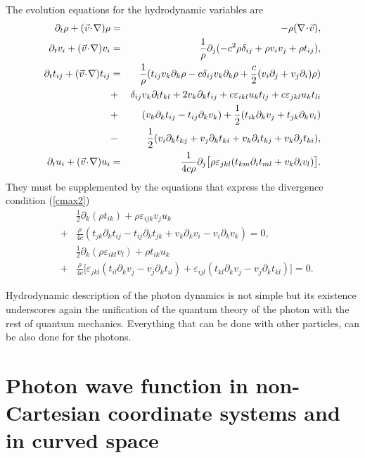 \documentclass[11pt]{article}
\begin{document}
The evolution equations for the hydrodynamic variables are
\begin{eqnarray}
  \partial_t\rho + (\vec v\!\cdot\!{\bf\nabla})\rho &=&
  -\rho({\bf\nabla}\!\cdot\!\vec v),\\
  \partial_t v_i + (\vec v\!\cdot\!{\bf\nabla}) v_i &=&
  \frac{1}{\rho}\partial_{j}(-c^2\rho\delta_{ij} +
  \rho v_i v_j +\rho t_{ij}),\\
  \partial_t t_{ij} + (\vec v\!\cdot\!{\bf\nabla}) t_{ij} &=&
  \frac{1}{\rho}(t_{ij}v_k\partial_{k}\rho-
  c\delta_{ij}v_k\partial_{k}\rho+
  \frac{c}{2}(v_i\partial_{j}+v_j\partial_{i})\rho)\nonumber\\
  &+&\delta_{ij}v_k\partial_{l} t_{kl}+2v_k\partial_{k} t_{ij}+
  c\varepsilon_{ikl}u_k t_{lj}+c\varepsilon_{jkl}u_k t_{li}\nonumber\\
  &+&(v_k\partial_{k} t_{ij}-t_{ij}\partial_{k} v_k)+
  \frac{1}{2}(t_{ik}\partial_{k} v_j+t_{jk}\partial_{k} v_i)\nonumber\\
  &-&\frac{1}{2}(v_i\partial_{k} t_{kj}+v_j\partial_{k} t_{ki}+
  v_k\partial_{i} t_{kj}+v_k\partial_{j} t_{ki}),\\
  \partial_t u_i + (\vec v\!\cdot\!{\bf\nabla}) u_i &=&
  \frac{1}{4c\rho}\partial_{j}\bigl[\rho\varepsilon_{jkl}
  (t_{km}\partial_{i} t_{ml} +v_k\partial_{i} v_l)\bigr].
\end{eqnarray}
They must be supplemented by the equations that express the divergence
condition (\ref{cmax2})
\begin{eqnarray}
  &&\frac{1}{2}\partial_{k}(\rho t_{ik})+\rho \varepsilon_{ijk} v_j u_k\\
 &+& \frac{\rho}{4c}(t_{jk}\partial_{k} t_{ij}-t_{ij}\partial_{k} t_{jk}+
  v_k\partial_{k} v_i-v_i\partial_{k} v_k) = 0,\nonumber\\
  &&\frac{1}{2}\partial_{k}(\rho\varepsilon_{ikl}v_l)+\rho t_{ik}u_k\\
 &+& \frac{\rho}{4c}\bigl[\varepsilon_{jkl}(t_{il}\partial_{k} v_j-
  v_j\partial_{k} t_{il})+
  \varepsilon_{ijl}(t_{kl}\partial_{k} v_j-v_j
  \partial_{k} t_{kl})\bigr]=0.\nonumber
\end{eqnarray}

Hydrodynamic description of the photon dynamics is not simple but its
existence underscores again the unification of the quantum theory of the
photon with the rest of quantum mechanics. Everything that can be done with
other particles, can be also done for the photons.

\section[Wave function in curved space]{Photon wave function in
non-Cartesian coordinate systems and in curved space\label{curved}}
\end{document}
